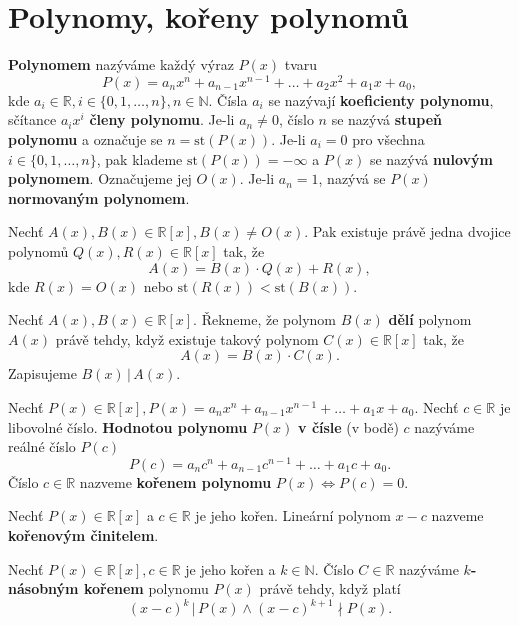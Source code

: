 \section{Polynomy, kořeny polynomů}
\begin{definition}
  \textbf{Polynomem} nazýváme každý výraz $P(x)$ tvaru
  \[
    P(x)=a_nx^n + a_{n-1}x^{n-1}+\dots + a_2x^2+a_1x+a_0,
  \]
  kde $a_i\in \mathbb R, i\in \{ 0,1,\dots , n \},n\in \mathbb N$. Čísla $a_i$ se nazývají \textbf{koeficienty polynomu}, sčítance $a_ix^i$ \textbf{členy polynomu}. Je-li $a_n\ne 0$, číslo $n$ se nazývá \textbf{stupeň polynomu} a označuje se $n= \text{st}(P(x))$. Je-li $a_i=0$ pro všechna $i \in \{ 0,1,\dots ,n\}$, pak klademe $\text{st}(P(x))=-\infty$ a $P(x)$ se nazývá \textbf{nulovým polynomem}. Označujeme jej $O(x).$ Je-li $a_n=1$, nazývá se $P(x)$ \textbf{normovaným polynomem}.
\end{definition}

\begin{veta}
  Nechť $A(x), B(x) \in \mathbb R[x],B(x) \ne O(x).$ Pak existuje právě jedna dvojice polynomů $Q(x),R(x)\in \mathbb R[x]$ tak, že
  \[
    A(x)=B(x)\cdot Q(x)+R(x),
  \]
  kde $R(x)=O(x)$ nebo $\text{st}(R(x))<\text{st}(B(x)).$
\end{veta}

\begin{definition}
  Nechť $A(x), B(x) \in \mathbb R[x]$. Řekneme, že polynom $B(x)$ \textbf{dělí} polynom $A(x)$ právě tehdy, když existuje takový polynom $C(x) \in \mathbb R[x]$ tak, že
  \[
    A(x) = B(x)\cdot C(x).
  \]
  Zapisujeme $B(x) \, | \, A(x).$
\end{definition}

\begin{definition}
  Nechť $P(x)\in \mathbb R[x], P(x)=a_nx^n+a_{n-1}x^{n-1}+\dots +a_1x+a_0.$ Nechť $c\in \mathbb R$ je libovolné číslo. \textbf{Hodnotou polynomu} $P(x)$ \textbf{v čísle} (v bodě) $c$ nazýváme reálné číslo $P(c)$
  \[
    P(c) = a_nc^n+a_{n-1}c^{n-1}+\dots+a_1c+a_0.
  \]
  Číslo $c\in \mathbb R$ nazveme \textbf{kořenem polynomu} $P(x) \iff P(c) = 0$.
\end{definition}


\begin{definition}
  Nechť $P(x) \in \mathbb R [x]$ a $c\in \mathbb R$ je jeho kořen. Lineární polynom $x-c$ nazveme \textbf{kořenovým činitelem}.
\end{definition}

\begin{definition}
  Nechť $P(x) \in \mathbb R [x], c \in \mathbb R$ je jeho kořen a $k \in \mathbb N$. Číslo $C \in \mathbb R$ nazýváme \textbf{$k$-násobným kořenem} polynomu $P(x)$ právě tehdy, když platí
  \[
    (x-c)^k \, | \, P(x) \land (x-c)^{k+1} \nmid  P(x).
  \]
\end{definition}

